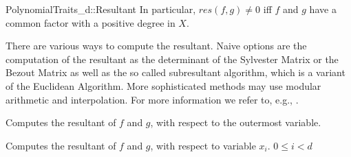\begin{ccRefConcept}{PolynomialTraits_d::Resultant}
In particular, $res(f,g) \neq 0$ iff $f$ and $g$ have a common factor with a 
positive degree in $X$. %

There are various ways to compute the resultant. 
Naive options are the computation of the resultant as the determinant of 
the Sylvester Matrix or the Bezout 
Matrix as well as the so called subresultant algorithm, 
which is a variant of the Euclidean Algorithm. 
More sophisticated methods may use modular arithmetic and interpolation. 
For more information we refer to, e.g., \cite{gg-mca-99}. 

\ccRefines 
{}

\ccTypes
{}
\ccGlue
{}
\ccGlue
{}

\ccOperations
{}
         { Computes the resultant of $f$ and $g$, 
           with respect to the outermost variable.}

         { Computes the resultant of $f$ and $g$,
           with respect to variable $x_i$. 
           \ccPrecond $0 \leq i  < d$ 
         }


\ccSeeAlso

\\
\\
\\

\end{ccRefConcept}
